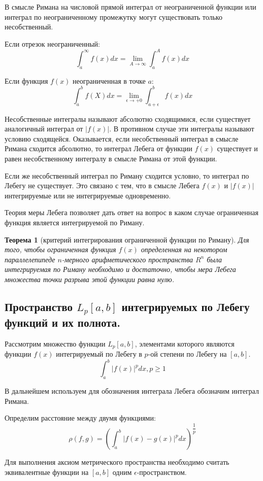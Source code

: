 \documentclass[14pt,a4paper]{extarticle}
\newtheorem{theorem}{Теорема}[section]
\theoremstyle{definition}
\theoremstyle{remark}
\renewcommand{\[}{\begin{dmath*}[compact]}
\renewcommand{\]}{\end{dmath*}}
\newcommand\f[2]{\dfrac{#1}{#2}}
\begin{document}
В смысле Римана на числовой прямой интеграл от неограниченной функции
или интеграл по неограниченному промежутку могут существовать
только несобственный.

Если отрезок неограниченный:
\[\int_a^\infty f(x)dx = \lim_{A \to \infty} \int_a^A f(x) dx\]

Если функция $f(x)$ неограниченная в точке $a$:
\[\int_a^b f(X)dx = \lim_{\epsilon \to +0} \int_{a+\epsilon}^b f(x) dx\]

Несобственные интегралы называют абсолютно сходящимися,
если существует аналогичный интеграл от $|f(x)|$.
В противном случае эти интегралы называют условию сходящейся.
Оказывается, если несобственный интеграл в смысле Римана сходится абсолютно,
то интеграл Лебега от функции $f(x)$ существует и равен несобственному
интегралу в смысле Римана от этой функции.

Если же несобственный интеграл по Риману сходится условно,
то интеграл по Лебегу не существует.
Это связано с тем, что в смысле Лебега $f(x)$ и $|f(x)|$ интегрируемые
или не интегрируемые одновременно.

Теория меры Лебега позволяет дать ответ на вопрос в каком случае
ограниченная функция является интегрируемой по Риману.

\begin{theorem}[критерий интегрирования ограниченной функции по Риману]
  Для того, чтобы ограниченная функция $f(x)$ определенная на некотором
  параллелепипеде $n$-мерного арифметического пространства $R^n$ была
  интегрируемая по Риману необходимо и достаточно,
  чтобы мера Лебега множества точки разрыва этой функции равна нулю.
\end{theorem}

\subsection{Пространство \texorpdfstring{$L_p[a,b]$}{Lg} интегрируемых
по Лебегу функций и их полнота.}

Рассмотрим множество функции $L_p[a,b]$, элементами которого являются
функции $f(x)$ интегрируемый по Лебегу в $p$-ой степени по Лебегу на $[a,b]$.
\[\int_a^b |f(x)|^p dx, p \geq 1\]

В дальнейшем используем для обозначения интеграла Лебега обозначим
интеграл Римана.

Определим расстояние между двумя функциями:
\[\rho(f,g)= \left( \int_a^b |f(x) - g(x)|^p dx \right) ^{\f{1}{p}}\]

Для выполнения аксиом метрического пространства необходимо считать
эквивалентные функции на $[a,b]$ одним $\epsilon$-пространством.
\end{document}
